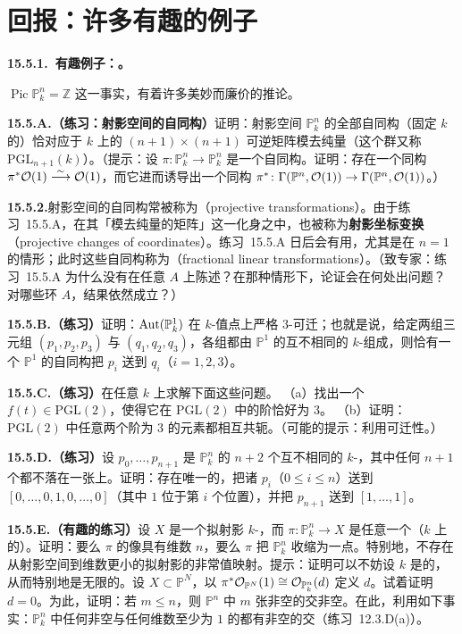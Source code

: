 
\section{回报：许多有趣的例子}

\textbf{15.5.1.\ 有趣例子：\trProjectiveTransformation。}

$\operatorname{Pic}\mathbb{P}^n_k=\mathbb{Z}$ 这一事实，有着许多美妙而廉价的推论。

\textbf{15.5.A.（练习：射影空间的自同构）}\quad 证明：射影空间 $\mathbb{P}^n_k$ 的全部自同构（固定 $k$ 的）恰对应于 $k$ 上的 $(n+1)\times(n+1)$ 可逆矩阵模去纯量（这个群又称 $\mathrm{PGL}_{n+1}(k)$）。（提示：设 $\pi\colon\mathbb{P}^n_k\to\mathbb{P}^n_k$ 是一个自同构。证明：存在一个同构 $\pi^*\mathcal{O}(1)\overset{\sim}{\longrightarrow}\mathcal{O}(1)$，而它进而诱导出一个同构 $\pi^*\colon\Gamma(\mathbb{P}^n,\mathcal{O}(1))\to\Gamma(\mathbb{P}^n,\mathcal{O}(1))$。）

\textbf{15.5.2.}\quad 射影空间的自同构常被称为\textbf{\trProjectiveTransformation}（projective transformations）。由于\mbox{练习~15.5.A}，在其「模去纯量的矩阵」这一化身之中，\trProjectiveTransformation{}也被称为\textbf{射影坐标变换}（projective changes of coordinates）。\mbox{练习~15.5.A} 日后会有用，尤其是在 $n=1$ 的情形；此时这些自同构称为\textbf{\trFractionalLinearTransformation}（fractional linear transformations）。（致专家：\mbox{练习~15.5.A} 为什么没有在任意\trBaseRing{} $A$ 上陈述？在那种情形下，论证会在何处出问题？对哪些环 $A$，结果依然成立？）

\textbf{15.5.B.（练习）}\quad 证明：$\operatorname{Aut}(\mathbb{P}^1_k)$ 在 $k$-值点上严格 $3$-可迁；也就是说，给定两组三元组 $(p_1,p_2,p_3)$ 与 $(q_1,q_2,q_3)$，各组都由 $\mathbb{P}^1$ 的互不相同的 $k$-\trValuedPoint{}组成，则恰有一个 $\mathbb{P}^1$ 的自同构把 $p_i$ 送到 $q_i$（$i=1,2,3$）。

\textbf{15.5.C.（练习）}\quad 在任意\trField{} $k$ 上求解下面这些问题。
（a）找出一个\trFractionalLinearTransformation $f(t)\in\mathrm{PGL}(2)$，使得它在 $\mathrm{PGL}(2)$ 中的阶恰好为 $3$。
（b）证明：$\mathrm{PGL}(2)$ 中任意两个阶为 $3$ 的元素都相互共轭。（可能的提示：利用可迁性。）

\textbf{15.5.D.（练习）}\quad 设 $p_0,\dots,p_{n+1}$ 是 $\mathbb{P}^n_k$ 的 $n+2$ 个互不相同的 $k$-\trValuedPoint，其中任何 $n+1$ 个都不落在一张\trHyperplane{}上。证明：存在唯一的\trProjectiveTransformation，把诸 $p_i$（$0\le i\le n$）送到 $[0,\dots,0,1,0,\dots,0]$（其中 $1$ 位于第 $i$ 个位置），并把 $p_{n+1}$ 送到 $[1,\dots,1]$。

\textbf{15.5.E.（有趣的练习）}\quad 设 $X$ 是一个拟射影 $k$-\trScheme，而 $\pi\colon\mathbb{P}^n_k\to X$ 是任意一个（$k$ 上的）\trMorphism。证明：要么 $\pi$ 的像具有维数 $n$，要么 $\pi$ 把 $\mathbb{P}^n_k$ 收缩为一点。特别地，不存在从射影空间到维数更小的拟射影\trVariety{}的非常值映射。提示：证明可以不妨设 $k$ 是\trAlgClosed{}的，从而特别地是无限的。设 $X\subset\mathbb{P}^N$，以 $\pi^*\mathcal{O}_{\mathbb{P}^N}(1)\cong\mathcal{O}_{\mathbb{P}^n_k}(d)$ 定义 $d$。试着证明 $d=0$。为此，证明：若 $m\le n$，则 $\mathbb{P}^n$ 中 $m$ 张非空\trHypersurface{}的交非空。在此，利用如下事实：$\mathbb{P}^n_k$ 中任何非空\trHypersurface{}与任何维数至少为 $1$ 的\trSubscheme{}都有非空的交（\mbox{练习~12.3.D}(a)）。

